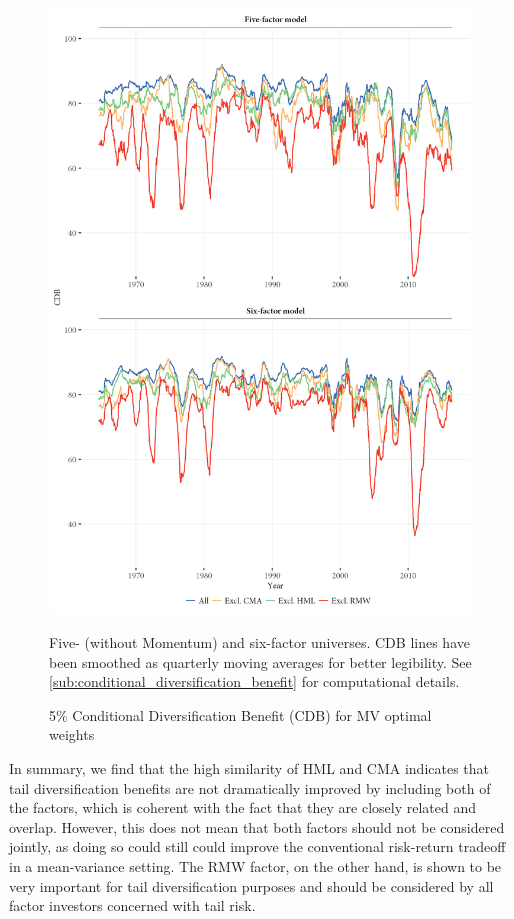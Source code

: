 \begin{figure}[htbp]
  \centering
  \footnotesize
  \includegraphics[width=\textwidth]{graphics/cdb/MV.png}
  \caption{5\% Conditional Diversification Benefit (CDB) for MV optimal weights}

  \begin{longcaption}
    Five- (without Momentum) and six-factor universes. CDB lines have been smoothed as quarterly moving averages for better legibility. See \autoref{sub:conditional_diversification_benefit} for computational details.
  \end{longcaption}
  \label{fig:mv_cdb}
\end{figure}



In summary, we find that the high similarity of HML and CMA indicates that tail diversification benefits are not dramatically improved by including both of the factors, which is coherent with the fact that they are closely related and overlap. However, this does not mean that both factors should not be considered jointly, as doing so could still could improve the conventional risk-return tradeoff in a mean-variance setting. The RMW factor, on the other hand, is shown to be very important for tail diversification purposes and should be considered by all factor investors concerned with tail risk.

